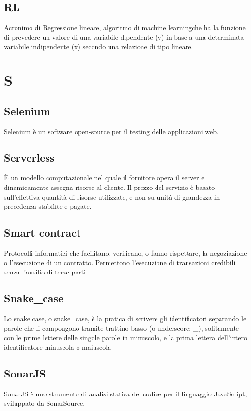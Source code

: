 \subsection*{RL}
Acronimo di Regressione lineare, algoritmo di machine learning\glosp che ha la funzione di prevedere un valore di una variabile dipendente (y) in base a una determinata variabile indipendente (x) secondo una relazione di tipo lineare.

\clearpage
\section*{S}

\subsection*{Selenium}
Selenium è un software open-source per il testing delle applicazioni web.

\subsection*{Serverless}
È un modello computazionale nel quale il fornitore opera il server e dinamicamente assegna risorse al cliente. Il prezzo del servizio è basato sull'effettiva quantità di risorse utilizzate, e non su unità di grandezza in precedenza stabilite e pagate.

\subsection*{Smart contract}
Protocolli informatici che facilitano, verificano, o fanno rispettare, la negoziazione o l'esecuzione di un contratto. Permettono l'esecuzione di transazioni credibili senza l'ausilio di terze parti.

\subsection*{Snake\_case}
Lo snake case, o snake\_case, è la pratica di scrivere gli identificatori separando le parole che li compongono tramite trattino basso (o underscore: \_), solitamente con le prime lettere delle singole parole in minuscolo, e la prima lettera dell'intero identificatore minuscola o maiuscola

\subsection*{SonarJS}
SonarJS è uno strumento di analisi statica del codice per il linguaggio JavaScript, sviluppato da SonarSource.

